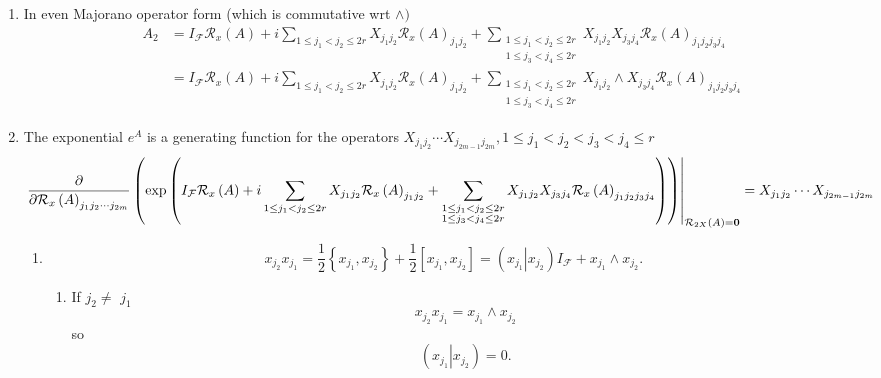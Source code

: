 \documentclass[aps,preprint]{revtex4}%
\begin{document}
\begin{enumerate}
\item In even Majorano operator form (which is commutative wrt $\wedge)$
\begin{align}
A_{2}  &  =I_{\mathcal{F}}\mathcal{R}_{x}\left(  A\right)  +i\sum_{1\leq
j_{1}<j_{2}\leq2r}X_{j_{1}j_{2}}\mathcal{R}_{x}\left(  A\right)  _{j_{1}j_{2}%
}+\sum_{\substack{1\leq j_{1}<j_{2}\leq2r\\1\leq j_{3}<j_{4}\leq2r}%
}X_{j_{1}j_{2}}X_{j_{3}j_{4}}\mathcal{R}_{x}\left(  A\right)  _{j_{1}%
j_{2}j_{3}j_{4}}\\
&  =I_{\mathcal{F}}\mathcal{R}_{x}\left(  A\right)  +i\sum_{1\leq j_{1}%
<j_{2}\leq2r}X_{j_{1}j_{2}}\mathcal{R}_{x}\left(  A\right)  _{j_{1}j_{2}}%
+\sum_{\substack{1\leq j_{1}<j_{2}\leq2r\\1\leq j_{3}<j_{4}\leq2r}%
}X_{j_{1}j_{2}}\wedge X_{j_{3}j_{4}}\mathcal{R}_{x}\left(  A\right)
_{j_{1}j_{2}j_{3}j_{4}}%
\end{align}


\item The exponential $e^{A}$ is a generating function for the operators
$X_{j_{1}j_{2}}\cdots X_{j_{2m-1}j_{2m}},1\leq j_{1}<j_{2}<j_{3}<j_{4}\leq r$%
\begin{equation}
\left.  \frac{{\Large \partial}}{{\Large \partial}\mathcal{R}_{x}\left(
A\right)  _{j_{1}j_{2}\cdots j_{2m}}}\left(  \exp\left(  I_{\mathcal{F}%
}\mathcal{R}_{x}\left(  A\right)  +i\sum_{1\leq j_{1}<j_{2}\leq2r}%
X_{j_{1}j_{2}}\mathcal{R}_{x}\left(  A\right)  _{j_{1}j_{2}}+\sum
_{\substack{1\leq j_{1}<j_{2}\leq2r\\1\leq j_{3}<j_{4}\leq2r}}X_{j_{1}j_{2}%
}X_{j_{3}j_{4}}\mathcal{R}_{x}\left(  A\right)  _{j_{1}j_{2}j_{3}j_{4}%
}\right)  \right)  \right\vert _{\mathcal{R}_{2X}\left(  A\right)
\mathbf{=0}}=X_{j_{1}j_{2}}\cdots X_{j_{2m-1}j_{2m}}%
\end{equation}


\begin{enumerate}
\item
\begin{equation}
x_{j_{2}}x_{j_{1}}=\frac{1}{2}\left\{  x_{j_{1}},x_{j_{2}}\right\}  +\frac
{1}{2}\left[  x_{j_{1}},x_{j_{2}}\right]  =\left(  \left.  x_{j_{1}%
}\right\vert x_{j_{2}}\right)  I_{\mathcal{F}}+x_{j_{1}}\wedge x_{j_{2}}.
\end{equation}


\begin{enumerate}
\item If $j_{2}\neq$ $j_{1}$
\begin{equation}
x_{j_{2}}x_{j_{1}}=x_{j_{1}}\wedge x_{j_{2}}%
\end{equation}
so
\begin{equation}
\left(  \left.  x_{j_{1}}\right\vert x_{j_{2}}\right)  =0.
\end{equation}



\end{enumerate}
\end{enumerate}
\end{enumerate}
\end{document}
